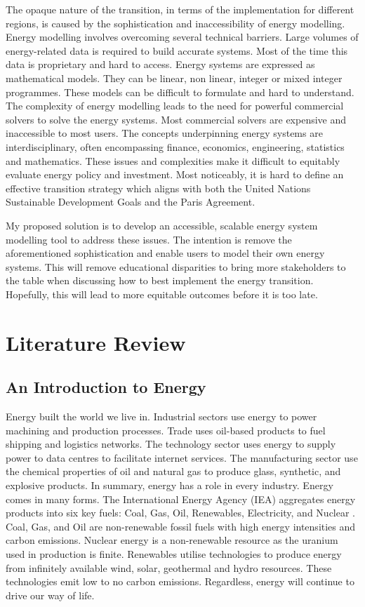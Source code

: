 \documentclass[12pt]{article}
\begin{document}
The opaque nature of the transition, in terms of the implementation for different regions, is caused by the sophistication and inaccessibility of energy modelling.
Energy modelling involves overcoming several technical barriers.
Large volumes of energy-related data is required to build accurate systems.
Most of the time this data is proprietary and hard to access.
Energy systems are expressed as mathematical models. 
They can be linear, non linear, integer or mixed integer programmes. 
These models can be difficult to formulate and hard to understand.
The complexity of energy modelling leads to the need for powerful commercial solvers to solve the energy systems.
Most commercial solvers are expensive and inaccessible to most users.
The concepts underpinning energy systems are interdisciplinary, often encompassing finance, economics, engineering, statistics and mathematics.
These issues and complexities make it difficult to equitably evaluate energy policy and investment.
Most noticeably, it is hard to define an effective transition strategy which aligns with both the United Nations Sustainable Development Goals and the Paris Agreement.

My proposed solution is to develop an accessible, scalable energy system modelling tool to address these issues.
The intention is remove the aforementioned sophistication and enable users to model their own energy systems.
This will remove educational disparities to bring more stakeholders to the table when discussing how to best implement the energy transition.
Hopefully, this will lead to more equitable outcomes before it is too late.
\newpage

\section{Literature Review}\label{LR}
\subsection{An Introduction to Energy}
Energy built the world we live in.
Industrial sectors use energy to power machining and production processes. 
Trade uses oil-based products to fuel shipping and logistics networks. 
The technology sector uses energy to supply power to data centres to facilitate internet services. 
The manufacturing sector use the chemical properties of oil and natural gas to produce glass, synthetic, and explosive products. 
In summary, energy has a role in every industry. 
Energy comes in many forms. 
The International Energy Agency (IEA) aggregates energy products into six key fuels: Coal, Gas, Oil, Renewables, Electricity, and Nuclear \cite{W:2}. 
Coal, Gas, and Oil are non-renewable fossil fuels with high energy intensities and carbon emissions. 
Nuclear energy is a non-renewable resource as the uranium used in production is finite. 
Renewables utilise technologies to produce energy from infinitely available wind, solar, geothermal and hydro resources. 
These technologies emit low to no carbon emissions. 
Regardless, energy will continue to drive our way of life.
\end{document}
